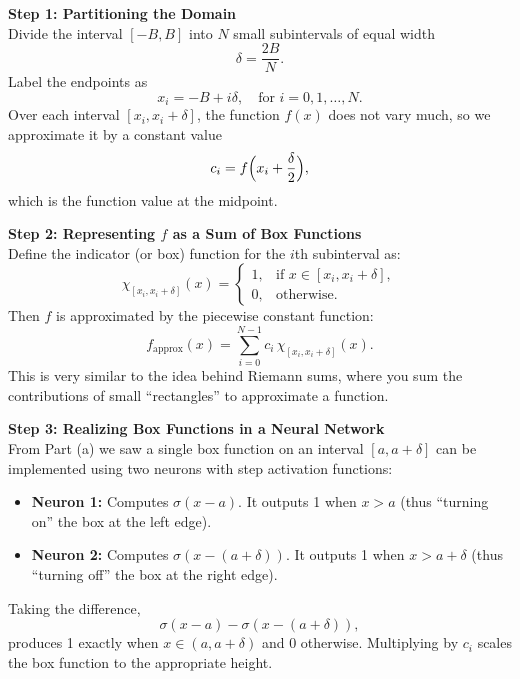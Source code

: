 \documentclass{article}
\begin{document}
\noindent\textbf{Step 1: Partitioning the Domain}\\[0.5em]
Divide the interval \([-B,B]\) into \(N\) small subintervals of equal width
\[
\delta = \frac{2B}{N}.
\]
Label the endpoints as
\[
x_i = -B + i\delta, \quad \text{for } i = 0, 1, \dots, N.
\]
Over each interval \([x_i, x_i+\delta]\), the function \( f(x) \) does not vary much, so we approximate it by a constant value
\[
c_i = f\Bigl(x_i + \frac{\delta}{2}\Bigr),
\]
which is the function value at the midpoint.

\noindent\textbf{Step 2: Representing \(f\) as a Sum of Box Functions}\\[0.5em]
Define the indicator (or box) function for the \(i\)th subinterval as:
\[
\chi_{[x_i,x_i+\delta]}(x) =
\begin{cases}
1, & \text{if } x \in [x_i, x_i+\delta],\\[1mm]
0, & \text{otherwise.}
\end{cases}
\]
Then \(f\) is approximated by the piecewise constant function:
\[
f_{\text{approx}}(x) = \sum_{i=0}^{N-1} c_i\, \chi_{[x_i,x_i+\delta]}(x).
\]
This is very similar to the idea behind Riemann sums, where you sum the contributions of small “rectangles” to approximate a function.

\noindent\textbf{Step 3: Realizing Box Functions in a Neural Network}\\[0.5em]
From Part (a) we saw a single box function on an interval \([a, a+\delta]\) can be implemented using two neurons with step activation functions:
\begin{itemize}
    \item \textbf{Neuron 1:} Computes \(\sigma(x - a)\). It outputs 1 when \(x > a\) (thus “turning on” the box at the left edge).
    \item \textbf{Neuron 2:} Computes \(\sigma(x - (a+\delta))\). It outputs 1 when \(x > a+\delta\) (thus “turning off” the box at the right edge).
\end{itemize}
Taking the difference,
\[
\sigma(x - a) - \sigma(x - (a+\delta)),
\]
produces 1 exactly when \(x \in (a, a+\delta)\) and 0 otherwise. Multiplying by \(c_i\) scales the box function to the appropriate height.
\end{document}
